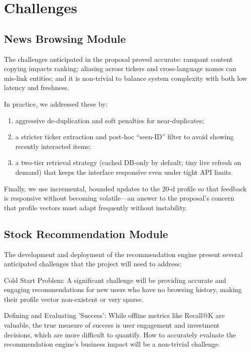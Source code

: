 \chapter{Challenges}
\section{News Browsing Module}

The challenges anticipated in the proposal proved accurate: rampant content copying impacts ranking; aliasing across tickers and cross-language names can mis-link entities; and it is non-trivial to balance system complexity with both low latency and freshness. 

In practice, we addressed these by:

\begin{enumerate}
	\item aggressive de-duplication and soft penalties for near-duplicates;
	\item  a stricter ticker extraction and post-hoc “seen-ID” filter to avoid showing recently interacted items; 
	\item a two-tier retrieval strategy (cached DB-only by default; tiny live refresh on demand) that keeps the interface responsive even under tight API limits. 
\end{enumerate}


Finally, we use incremental, bounded updates to the 20-d profile so that feedback is responsive without becoming volatile---an answer to the proposal’s concern that profile vectors must adapt frequently without instability.

\section{Stock Recommendation Module}

The development and deployment of the recommendation engine present several anticipated challenges that the project will need to address:

Cold Start Problem: A significant challenge will be providing accurate and engaging recommendations for new users who have no browsing history, making their profile vector non-existent or very sparse. 

Defining and Evaluating 'Success': While offline metrics like Recall@K are valuable, the true measure of success is user engagement and investment decisions, which are more difficult to quantify. How to accurately evaluate the recommendation engine's business impact will be a non-trivial challenge.

